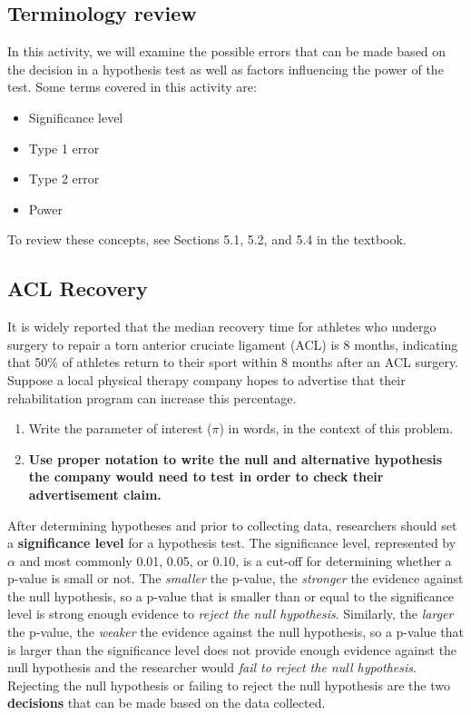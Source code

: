 \documentclass[
]{report}
\begin{document}
\hypertarget{terminology-review-11}{%
\subsection{Terminology review}\label{terminology-review-11}}

In this activity, we will examine the possible errors that can be made based on the decision in a hypothesis test as well as factors influencing the power of the test. Some terms covered in this activity are:

\begin{itemize}
\item
  Significance level
\item
  Type 1 error
\item
  Type 2 error
\item
  Power
\end{itemize}

To review these concepts, see Sections 5.1, 5.2, and 5.4 in the textbook.

\hypertarget{acl-recovery}{%
\subsection{ACL Recovery}\label{acl-recovery}}

It is widely reported that the median recovery time for athletes who undergo surgery to repair a torn anterior cruciate ligament (ACL) is 8 months, indicating that 50\% of athletes return to their sport within 8 months after an ACL surgery. Suppose a local physical therapy company hopes to advertise that their rehabilitation program can increase this percentage.

\begin{enumerate}
\def\labelenumi{\arabic{enumi}.}
\item
  Write the parameter of interest (\(\pi\)) in words, in the context of this problem.
  \vspace{0.5in}
\item
  \textbf{Use proper notation to write the null and alternative hypothesis the company would need to test in order to check their advertisement claim.}
  \vspace{0.5in}
\end{enumerate}

After determining hypotheses and prior to collecting data, researchers should set a \textbf{significance level} for a hypothesis test. The significance level, represented by \(\alpha\) and most commonly 0.01, 0.05, or 0.10, is a cut-off for determining whether a p-value is small or not. The \emph{smaller} the p-value, the \emph{stronger} the evidence against the null hypothesis, so a p-value that is smaller than or equal to the significance level is strong enough evidence to \emph{reject the null hypothesis}. Similarly, the \emph{larger} the p-value, the \emph{weaker} the evidence against the null hypothesis, so a p-value that is larger than the significance level does not provide enough evidence against the null hypothesis and the researcher would \emph{fail to reject the null hypothesis}. Rejecting the null hypothesis or failing to reject the null hypothesis are the two \textbf{decisions} that can be made based on the data collected.
\end{document}
